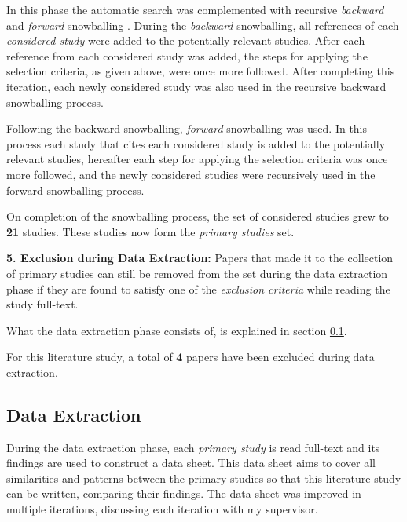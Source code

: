 In this phase the automatic search was complemented with recursive \textit{backward} and \textit{forward} snowballing \cite{wohlin2014snowballing}.
During the \textit{backward} snowballing, all references of each \textit{considered study} were added to the potentially relevant studies. 
After each reference from each considered study was added, the steps for applying the selection criteria, as given above, were once more followed. 
After completing this iteration, each newly considered study was also used in the recursive backward snowballing process.

Following the backward snowballing, \textit{forward} snowballing was used. 
In this process each study that cites each considered study is added to the potentially relevant studies, hereafter each step for applying the selection criteria was once more followed, and the newly considered studies were recursively used in the forward snowballing process.

\vspace{5mm}

On completion of the snowballing process, the set of considered studies grew to \textbf{21} studies. These studies now form the \textit{primary studies} set.

\vspace{5mm}

\noindent\textbf{5. Exclusion during Data Extraction:}
Papers that made it to the collection of primary studies can still be removed from the set during the data extraction phase if they 
are found to satisfy one of the \textit{exclusion criteria} while reading the study full-text.

What the data extraction phase consists of, is explained in section \ref{sec:study_design:data_extract}.

For this literature study, a total of \textbf{4} papers have been excluded during data extraction. 

\subsection{Data Extraction}
\label{sec:study_design:data_extract}
During the data extraction phase, each \textit{primary study} is read full-text and its findings are used to construct a data sheet.
This data sheet aims to cover all similarities and patterns between the primary studies so that this literature study can be written, comparing their findings.
The data sheet was improved in multiple iterations, discussing each iteration with my supervisor.

